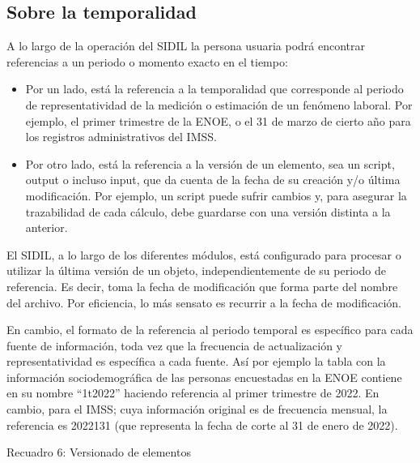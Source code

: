 \documentclass[
]{article}
\begin{document}
\hypertarget{temporalidad}{%
\subsection{Sobre la temporalidad}\label{temporalidad}}

A lo largo de la operación del SIDIL la persona usuaria podrá encontrar referencias a un periodo o momento exacto en el tiempo:

\begin{itemize}
\item
  Por un lado, está la referencia a la temporalidad que corresponde al periodo de representatividad de la medición o estimación de un fenómeno laboral. Por ejemplo, el primer trimestre de la ENOE, o el 31 de marzo de cierto año para los registros administrativos del IMSS.
\item
  Por otro lado, está la referencia a la versión de un elemento, sea un script, output o incluso input, que da cuenta de la fecha de su creación y/o última modificación. Por ejemplo, un script puede sufrir cambios y, para asegurar la trazabilidad de cada cálculo, debe guardarse con una versión distinta a la anterior.
\end{itemize}

El SIDIL, a lo largo de los diferentes módulos, está configurado para procesar o utilizar la última versión de un objeto, independientemente de su periodo de referencia. Es decir, toma la fecha de modificación que forma parte del nombre del archivo. Por eficiencia, lo más sensato es recurrir a la fecha de modificación.

En cambio, el formato de la referencia al periodo temporal es específico para cada fuente de información, toda vez que la frecuencia de actualización y representatividad es específica a cada fuente. Así por ejemplo la tabla con la información sociodemográfica de las personas encuestadas en la ENOE contiene en su nombre ``1t2022'' haciendo referencia al primer trimestre de 2022. En cambio, para el IMSS; cuya información original es de frecuencia mensual, la referencia es 2022131 (que representa la fecha de corte al 31 de enero de 2022).

Recuadro 6: Versionado de elementos
\end{document}
